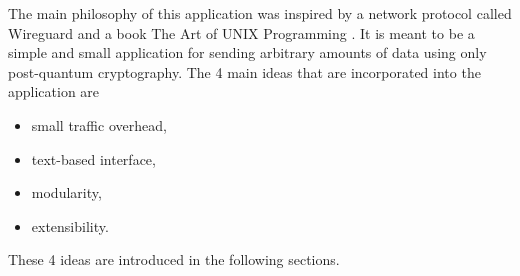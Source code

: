 The main philosophy of this application was inspired by a network protocol called Wireguard \cite{Donenfeld2020} and a book The Art of UNIX Programming \cite{Raymond2003}. It is meant to be a simple and small application for sending arbitrary amounts of data using only post-quantum cryptography. The 4 main ideas that are incorporated into the application are
\begin{itemize}
  \item small traffic overhead,
  \item text-based interface,
  \item modularity,
  \item extensibility.
\end{itemize}
These 4 ideas are introduced in the following sections.

